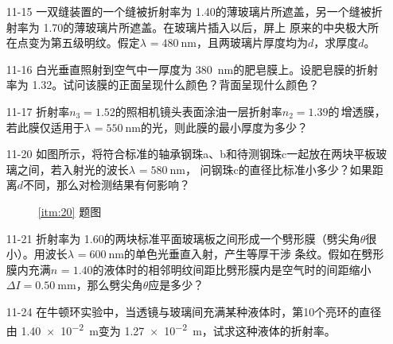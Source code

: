 \documentclass[UTF-8]{ctexart}
\makeatletter
\newcommand{\mlabel}[2]{#2\def\@currentlabel{#2}\label{#1}}
\newcommand{\csi}[2]{ \SI{#1}{#2}}
\newcommand{\lbd}[3]{\(\lambda_{#3}=\csi{#1}{#2}\)}
\newcommand{\ri}[2]{\(n_{#2}={#1}\)}
\makeatother
\begin{document}
\begin{enumerate}
\begin{figure}[htb]
\begin{minipage}[b]{0.4\textwidth}
            \end{minipage}
        \end{figure}
    \item[11-15] 一双缝装置的一个缝被折射率为\csi{1.40}{}的薄玻璃片所遮盖，另一个缝被折射率为\csi{1.70}{}的薄玻璃片所遮盖。在玻璃片插入以后，屏上
        原来的中央极大所在点变为第五级明纹。假定\lbd{480}{\nm}{}，且两玻璃片厚度均为\(d\)，求厚度\(d\)。
    \item[11-16] 白光垂直照射到空气中一厚度为\csi{380}{\nm}的肥皂膜上。设肥皂膜的折射率为\csi{1.32}{}。试问该膜的正面呈现什么颜色？背面呈现什么颜色？
    \item[11-17] 折射率\ri{1.52}{3}的照相机镜头表面涂油一层折射率\ri{1.39}{2}的\,增透膜，若此膜仅适用于\lbd{550}{\nm}{}的光，则此膜的最小厚度为多少？
    \item[\mlabel{itm:20}{11-20}] 如图所示，将符合标准的轴承钢珠a、b和待测钢珠c一起放在两块平板玻璃之间，若入射光的波长\lbd{580}{\nm}{}，
        问钢珠c的直径比标准小多少？如果距离\(d\)不同，那么对检测结果有何影响？
        \begin{figure}[htb]
            \centering
            \begin{minipage}[b]{0.4\textwidth}
                \centering
                \caption{\ref{itm:20} 题图}
            \end{minipage}
        \end{figure}
    \item[11-21] 折射率为\csi{1.60}{}的两块标准平面玻璃板之间形成一个劈形膜（劈尖角\(\theta\)很小）。用波长\lbd{600}{\nm}{}的单色光垂直入射，产生等厚干涉
        条纹。假如在劈形膜内充满\ri{1.40}{}的液体时的相邻明纹间距比劈形膜内是空气时的间距缩小\(\Delta I=\csi{0.50}{\mm}\)，那么劈尖角\(\theta\)应是多少？
    \item[11-24] 在牛顿环实验中，当透镜与玻璃间充满某种液体时，第10个亮环的直径由\csi{1.40e-2}{\m}变为\csi{1.27e-2}{\m}，试求这种液体的折射率。

\end{enumerate}
\end{document}
